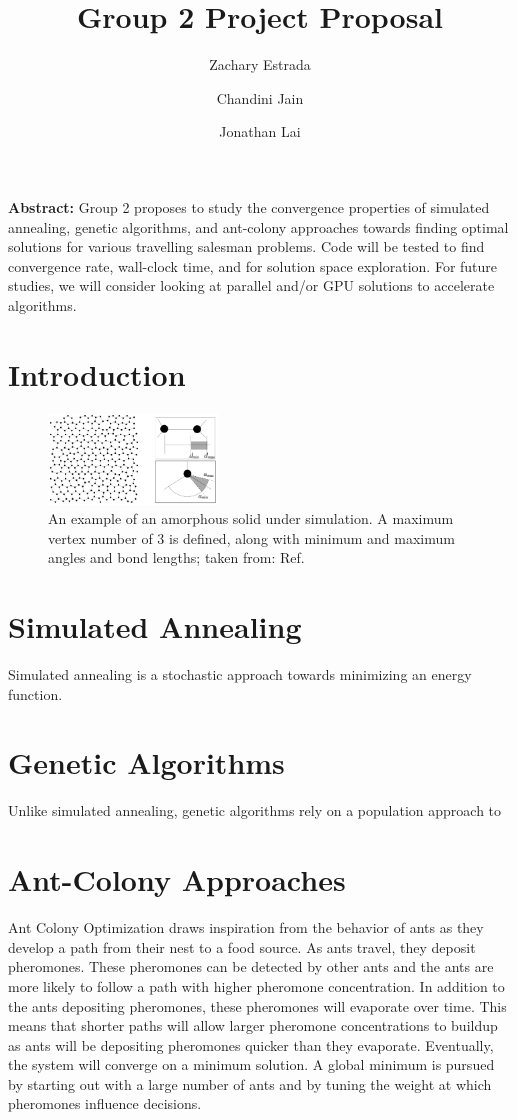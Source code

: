 \documentclass[12pt,onecolumn,notitlepage]{article}
\title{\vspace{-4ex} \textbf{Group 2 Project Proposal}}
\author{Zachary Estrada \and Chandini Jain \and Jonathan Lai}
\begin{document}
\maketitle

\textbf{Abstract:} Group 2 proposes to study the convergence
properties of simulated annealing, genetic algorithms, and ant-colony approaches towards
finding optimal solutions for various travelling salesman problems.  Code will be tested
to find convergence rate, wall-clock time, and for solution space exploration.  For future studies,
we will consider looking at parallel and/or GPU solutions to accelerate algorithms.

\section{Introduction}
\begin{figure}[!h]
\centering
\includegraphics[width=0.4\textwidth]{Figures/amorphousSilicon.png}
\caption{An example of an amorphous solid under simulation.  A maximum vertex number of 3 is defined, along with minimum and maximum angles and bond lengths; taken from: Ref. \protect{}}
\label{fig:amorphousSilicon}
\end{figure}


\section{Simulated Annealing}
Simulated annealing is a stochastic approach towards minimizing an energy function.

\section{Genetic Algorithms}
Unlike simulated annealing, genetic algorithms rely on a population approach to 

\section{Ant-Colony Approaches}
Ant Colony Optimization\cite{Dorigo96theant} draws inspiration from the behavior of ants as they develop a path from their nest to a food source.  As ants travel, they deposit pheromones.  These pheromones can be detected by other ants and the ants are more likely to follow a path with higher pheromone concentration.  In addition to the ants depositing pheromones, these pheromones will evaporate over time.  This means that shorter paths will allow larger pheromone concentrations to buildup as ants will be depositing pheromones quicker than they evaporate.  Eventually, the system will converge on a minimum solution.  A global minimum is pursued by starting out with a large number of ants and by tuning the weight at which pheromones influence decisions. 
\end{document}

